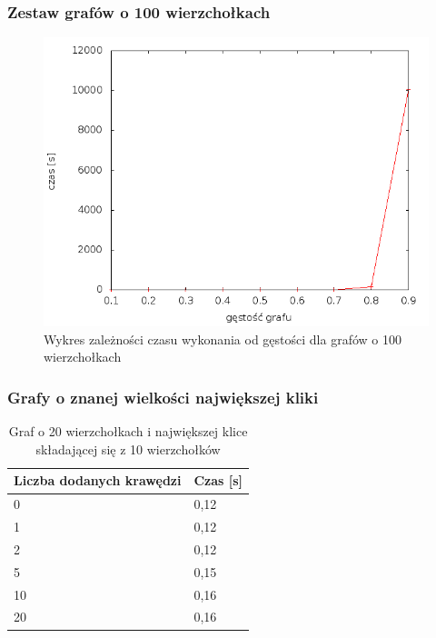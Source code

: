 \documentclass[12pt, a4paper]{article}
\begin{document}
\subsubsection*{Zestaw grafów o 100 wierzchołkach}
\begin{figure}[!h]
    \begin{center}
	\includegraphics[scale=0.5]{results/img/dim/dim_100.png}
	\caption{Wykres zależności czasu wykonania od gęstości dla grafów o 100 wierzchołkach}
    \end{center}
\end{figure}
\FloatBarrier

\subsubsection*{Grafy o znanej wielkości największej kliki}
\begin{table}[H]
\caption{Graf o 20 wierzchołkach i największej klice składającej się z 10 wierzchołków}
\begin{center}
    \begin{tabular}{|l|l|}
    \hline
    Liczba dodanych krawędzi & Czas [s] \\ \hline
    0 & 0,12 \\ \hline
    1 & 0,12 \\ \hline
    2 & 0,12 \\ \hline
    5 & 0,15 \\ \hline
    10 & 0,16 \\ \hline
    20 & 0,16 \\ \hline
    \end{tabular}
\end{center}
\end{table}
\end{document}
